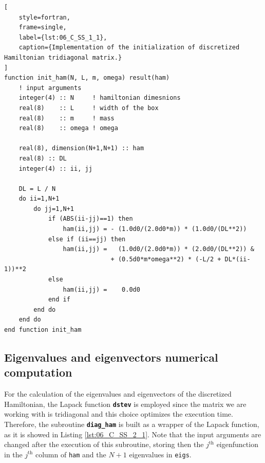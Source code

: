\documentclass[pra, onecolumn, notitlepage, floats, 11pt]{revtex4-1}
\newcommand{\codebold}[2][cobalt]{\texttt{\bfseries {\color{#1}#2}}}
\newcommand{\code}[2][black]{\color{#1}\texttt{#2}}
\begin{document}
\medskip
\begin{lstlisting}[
    style=fortran,
    frame=single,
    label={lst:06_C_SS_1_1},
    caption={Implementation of the initialization of discretized Hamiltonian tridiagonal matrix.}
]
function init_ham(N, L, m, omega) result(ham)
    ! input arguments
    integer(4) :: N     ! hamiltonian dimesnions
    real(8)    :: L     ! width of the box
    real(8)    :: m     ! mass
    real(8)    :: omega ! omega

    real(8), dimension(N+1,N+1) :: ham
    real(8) :: DL
    integer(4) :: ii, jj

    DL = L / N
    do ii=1,N+1
        do jj=1,N+1
            if (ABS(ii-jj)==1) then
                ham(ii,jj) = - (1.0d0/(2.0d0*m)) * (1.0d0/(DL**2))
            else if (ii==jj) then
                ham(ii,jj) =   (1.0d0/(2.0d0*m)) * (2.0d0/(DL**2)) &
                             + (0.5d0*m*omega**2) * (-L/2 + DL*(ii-1))**2
            else
                ham(ii,jj) =    0.0d0
            end if
        end do
    end do
end function init_ham
\end{lstlisting}



\subsection{Eigenvalues and eigenvectors numerical computation}
For the calculation of the eigenvalues and eigenvectors of the discretized Hamiltonian, the Lapack function \codebold[black]{dstev} is employed since the matrix we are working with is tridiagonal and this choice optimizes the execution time. Therefore, the subroutine \codebold[black]{diag\_ham} is built as a wrapper of the Lapack function, as it is showed in Listing \ref{lst:06_C_SS_2_1}. Note that the input arguments are changed after the execution of this subroutine, storing then the \( j^{\text{th}} \) eigenfunction in the \( j^{\text{th}} \) column of \code{ham} and the \( N+1 \) eigenvalues in \code{eigs}.
\end{document}
